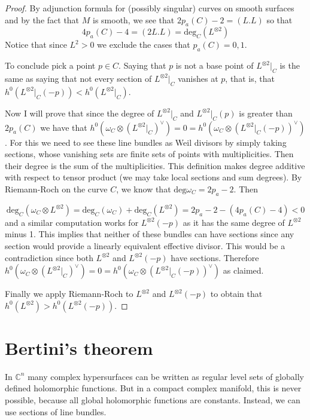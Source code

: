 \begin{proof}
By adjunction formula for (possibly singular) curves on smooth surfaces and by 
the fact that $M$ is smooth, we see that $2p_a(C)-2=(L.L)$ so that
$$
4p_a(C)-4=(2L.L)=\text{deg}_C(L^{\otimes 2})
$$
Notice that since $L^2>0$ we exclude the cases that $p_a(C)=0,1$.

To conclude pick a point $p\in C$. Saying that $p$ is not a base point of
$L^{\otimes 2}|_{C}$ is the same as saying that not every section of $L^{\otimes
2}|_{C}$ vanishes at $p$, that is, that 
$h^0(L^{\otimes 2}|_{C}(-p))<h^0(L^{\otimes 2}|_{C})$.

Now I will prove that since the degree of $L^{\otimes 2}|_{C}$ and $L^{\otimes
2}|_{C}(p)$ is greater than $2p_a(C)$ we have that 
$h^0(\omega_C\otimes (L^{\otimes2}|_{C})^\vee)=0
=h^0(\omega_C\otimes (L^{\otimes 2}|_{C}(-p))^\vee)$. For this we need to see these line
bundles as Weil divisors by simply taking sections, whose vanishing sets are 
finite sets of points with multiplicities. Then their degree is the sum of the
multiplicities.  This definition makes degree additive with respect to tensor
product (we may take local sections and sum degrees). By Riemann-Roch on the curve
$C$, we know that $\text{deg}\omega_C=2p_a-2$. Then

$$
\text{deg}_C(\omega_C\otimes L^{\otimes 2})
=\text{deg}_C(\omega_C)+\text{deg}_C(L^{\otimes 2})
=2p_a-2-(4p_a(C)-4)<0
$$
and a similar computation works for $L^{\otimes 2}(-p)$ as it has the same
degree of $L^{\otimes 2}$ minus 1. This implies that neither of these bundles
can have sections since any section would provide a linearly equivalent
effective divisor. This would be a contradiction since both
$L^{\otimes 2}$ and $L^{\otimes 2}(-p)$ have sections. Therefore 
$h^0(\omega_C\otimes (L^{\otimes2}|_{C})^\vee)=0
=h^0(\omega_C\otimes (L^{\otimes 2}|_{C}(-p))^\vee)$ as claimed.

Finally we apply Riemann-Roch to $L^{\otimes 2}$ and $L^{\otimes 2}(-p)$ to
obtain that $h^0(L^{\otimes 2})>h^0(L^{\otimes 2}(-p))$.
\end{proof}

\section{Bertini's theorem}
\label{section-Bertini-theorem}

\begin{slogan}
In \(\mathbb{C}^n\) many complex hypersurfaces can be written as regular level
sets of globally defined holomorphic functions. But in a compact complex
manifold, this is never possible, because all global holomorphic functions are
constants. Instead, we can use sections of line bundles.
\end{slogan}

